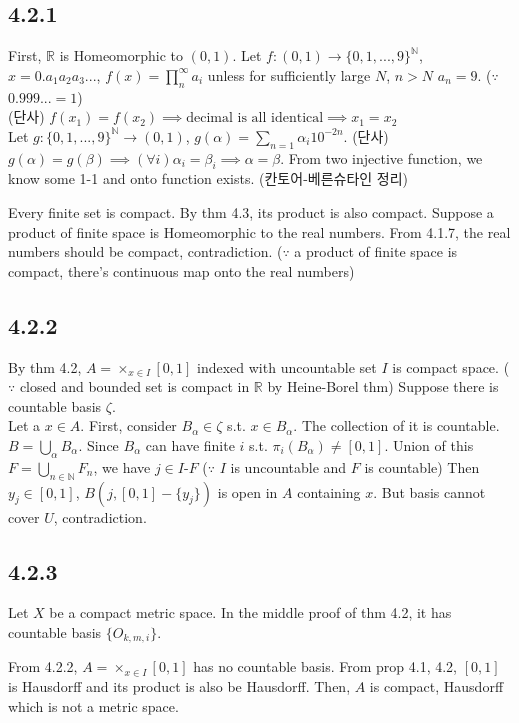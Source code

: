 \documentclass{article}
\begin{document}
\subsection*{4.2.1}

First, $\mathbb{R}$ is Homeomorphic to $(0,1)$. Let $f:(0,1)\to \{0,1,...,9\}^\mathbb{N}$, $x=0.a_1a_2a_3...$, $f(x)=\prod_n^\infty a_i$ unless for sufficiently large $N$, $n>N$ $a_n=9$. ($\because$ $0.999...=1$)\\
(단사) $f(x_1)=f(x_2) \implies \text{decimal is all identical} \implies x_1=x_2$\\
Let $g:\{0,1,...,9\}^\mathbb{N} \to (0,1)$, $g(\alpha)=\sum_{n=1} \alpha_i 10^{-2n}$.
(단사) $g(\alpha)=g(\beta)  \implies (\forall i)\alpha_i=\beta_i \implies \alpha = \beta$.
From two injective function, we know some 1-1 and onto function exists. (칸토어-베른슈타인 정리)

Every finite set is compact. By thm 4.3, its product is also compact. Suppose a product of finite space is Homeomorphic to the real numbers. From 4.1.7, the real numbers should be compact, contradiction. ($\because$ a product of finite space is compact, there's continuous map onto the real numbers)

\subsection*{4.2.2}

By thm 4.2, $A=\times_{x\in I} [0,1]$ indexed with uncountable set $I$ is compact space. ($\because$ closed and bounded set is compact in $\mathbb{R}$ by Heine-Borel thm) Suppose there is countable basis $\zeta$.\\
Let a $x \in A$. First, consider $B_\alpha\in\zeta$ s.t. $x \in B_\alpha$. The collection of it is countable. $B=\bigcup_{\alpha} B_\alpha$. Since $B_\alpha$ can have finite $i$ s.t. $\pi_i(B_\alpha)\neq [0,1]$. Union of this $F=\bigcup_{n\in \mathbb{N}} F_n$, we have $j\in I \text{-}F$ ($\because$ $I$ is uncountable and $F$ is countable) Then $y_j\in [0,1]$, $B(j, [0,1]-\{y_j\})$ is open in $A$ containing $x$. But basis cannot cover $U$, contradiction.

\subsection*{4.2.3}

Let $X$ be a compact metric space. In the middle proof of thm 4.2, it has countable basis $\{O_{k,m,i}\}$.

From 4.2.2, $A=\times_{x\in I} [0,1]$ has no countable basis. From prop 4.1, 4.2, $[0,1]$ is Hausdorff and its product is also be Hausdorff. Then, $A$ is compact, Hausdorff which is not a metric space.
\end{document}
